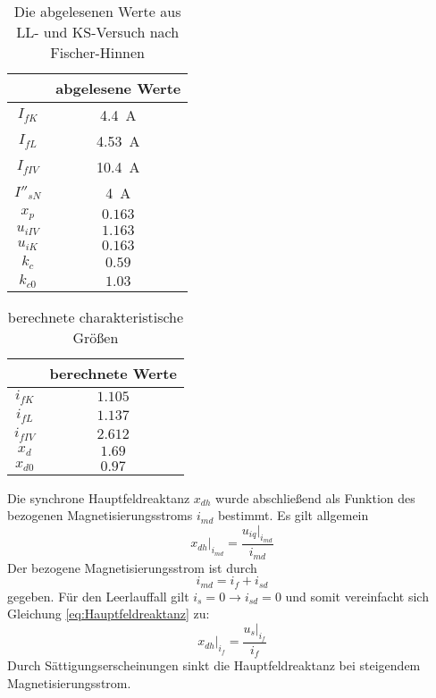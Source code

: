 \begin{table}[!ht]
\centering
\begin{tabular}{|c|c|}
\hline
            & abgelesene Werte      \\ \hline
$I_{fK}$    &  \SI{4.4}{\ampere}    \\ \hline
$I_{fL}$    & \SI{4.53}{\ampere}    \\ \hline
$I_{fIV}$   & \SI{10.4}{\ampere}    \\ \hline
$I''_{sN}$  & \SI{4}{\ampere}       \\ \hline
$x_p$       & $0.163$               \\ \hline
$u_{iIV}$   & $1.163$               \\ \hline
$u_{iK}$    & $0.163$               \\ \hline
$k_c$       & $0.59$                \\ \hline
$k_{c0}$    & $1.03$                \\ \hline
\end{tabular}
\caption{Die abgelesenen Werte aus LL- und KS-Versuch nach Fischer-Hinnen}
\label{tab:Fischer_Hinnen_abgelesene_Werte}
\end{table}

\begin{table}[!ht]
\centering
\begin{tabular}{|c|c|}
\hline
            & berechnete Werte  \\ \hline
$i_{fK}$    &  $1.105$          \\ \hline
$i_{fL}$    & $1.137$           \\ \hline
$i_{fIV}$   & $2.612$           \\ \hline
$x_d$       & $1.69$            \\ \hline
$x_{d0}$   & $0.97$            \\ \hline
\end{tabular}
\caption{berechnete charakteristische Größen}
\label{tab:Fischer_Hinnen_berechnete_Werte}
\end{table}
Die synchrone Hauptfeldreaktanz $x_{dh}$ wurde abschließend als Funktion des bezogenen Magnetisierungsstroms $i_{md}$ bestimmt. Es gilt allgemein
\begin{equation*}
    \label{eq:Hauptfeldreaktanz}
    x_{dh} \big|_{i_{md}} = \frac{u_{iq} \big|_{i_{md}}}{i_{md}}
\end{equation*}
Der bezogene Magnetisierungsstrom ist durch 
\begin{equation*}
    i_{md} = i_f + i_{sd}
\end{equation*}
gegeben. Für den Leerlauffall gilt $i_s = 0 \rightarrow i_{sd} = 0$ und somit vereinfacht sich Gleichung \ref{eq:Hauptfeldreaktanz} zu:
\begin{equation*}
        x_{dh} \big|_{i_{f}} = \frac{u_{s} \big|_{i_{f}}}{i_{f}}
\end{equation*}
Durch Sättigungserscheinungen sinkt die Hauptfeldreaktanz bei steigendem Magnetisierungsstrom. 
